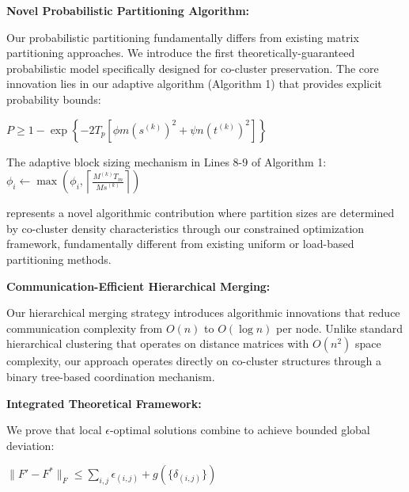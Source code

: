\documentclass{ar2rc}
\begin{document}


\textbf{Novel Probabilistic Partitioning Algorithm:}

Our probabilistic partitioning fundamentally differs from existing matrix partitioning approaches. We introduce the first theoretically-guaranteed probabilistic model specifically designed for co-cluster preservation. The core innovation lies in our adaptive algorithm (Algorithm 1) that provides explicit probability bounds:

$P \geq 1 - \exp\left\{-2T_p\left[\phi m (s^{(k)})^2 + \psi n (t^{(k)})^2\right]\right\}$

The adaptive block sizing mechanism in Lines 8-9 of Algorithm 1:
$\phi_i \leftarrow \max\left(\phi_i, \left\lceil\frac{M^{(k)}T_m}{Ms^{(k)}}\right\rceil\right)$

represents a novel algorithmic contribution where partition sizes are determined by co-cluster density characteristics through our constrained optimization framework, fundamentally different from existing uniform or load-based partitioning methods.

\textbf{Communication-Efficient Hierarchical Merging:}

Our hierarchical merging strategy introduces algorithmic innovations that reduce communication complexity from $O(n)$ to $O(\log n)$ per node. Unlike standard hierarchical clustering that operates on distance matrices with $O(n^2)$ space complexity, our approach operates directly on co-cluster structures through a binary tree-based coordination mechanism.

\textbf{Integrated Theoretical Framework:}

We prove that local $\epsilon$-optimal solutions combine to achieve bounded global deviation:

$\|F' - F^*\|_F \leq \sum_{i,j} \epsilon_{(i,j)} + g(\{\delta_{(i,j)}\})$
\end{document}
